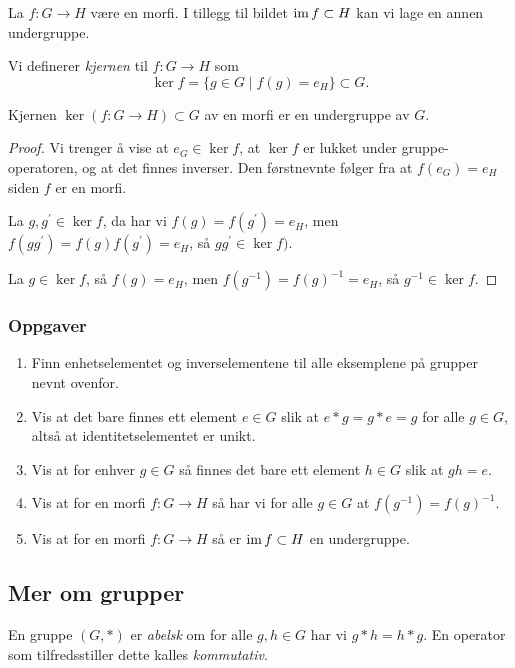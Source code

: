 La $f\colon G\to H$ være en morfi.
I tillegg til bildet $\operatorname{im} f\subset H$ kan vi lage en annen undergruppe.
\begin{definition}
    Vi definerer \textit{kjernen} til $f\colon G\to H$
    som
    \[
        \ker f = \{ g\in G\mid f(g) = e_H\} \subset G.
    \]
\end{definition}

\begin{lemma}
    Kjernen $\ker (f\colon G\to H)\subset G$ av en morfi er en undergruppe av $G$.
\end{lemma}
\begin{proof}
    Vi trenger å vise at $e_G\in \ker f$, at $\ker f$ er lukket under
    gruppe-operatoren, og at det finnes inverser.
    Den førstnevnte følger fra at $f(e_G) = e_H$ siden $f$ er en morfi.

    La $g,g^\prime \in\ker f$, da har vi $f(g) = f(g^\prime) = e_H$,
    men $f(gg^\prime) = f(g)f(g^\prime) = e_H$, så $gg^\prime\in \ker f)$.

    La $g\in \ker f$, så $f(g) = e_H$, men $f(g^{-1}) = {f(g)}^{-1} = e_H$,
    så $g^{-1}\in\ker f$.
\end{proof}

\subsubsection*{Oppgaver}
\begin{enumerate}
    \item Finn enhetselementet og inverselementene til alle eksemplene på
        grupper nevnt ovenfor.
    \item Vis at det bare finnes ett element $e\in G$ slik
        at $e \ast g = g\ast e = g$ for alle $g\in G$,
        altså at identitetselementet er unikt.
    \item Vis at for enhver $g\in G$ så finnes det bare ett element
        $h\in G$ slik at $gh = e$.
    \item Vis at for en morfi $f\colon G\to H$
        så har vi for alle $g\in G$ at $f(g^{-1}) = {f(g)}^{-1}$.
    \item Vis at for en morfi $f\colon G\to H$ så er $\operatorname{im} f\subset H$ en undergruppe.
\end{enumerate}

\subsection{Mer om grupper}

\begin{definition}
    En gruppe $(G, \ast)$ er \textit{abelsk} om
    for alle $g,h\in G$ har vi $g\ast h = h\ast g$.
    En operator som tilfredsstiller dette kalles \textit{kommutativ}.
\end{definition}

